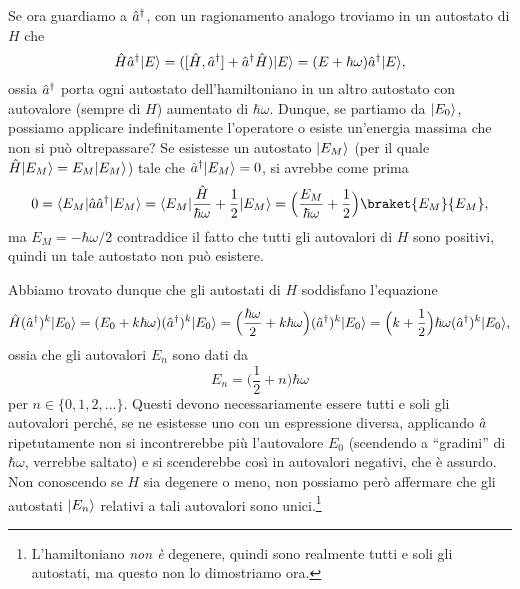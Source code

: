 Se ora guardiamo a $\hat{a}^\dagger$, con un ragionamento analogo troviamo in un autostato di $H$ che
\begin{equation}
	\hat{H}\hat{a}^\dagger\lvert E\rangle=([\hat{H},\hat{a}^\dagger]+\hat{a}^\dagger\hat{H})\lvert E\rangle=(E+\hbar\omega)\hat{a}^\dagger\lvert E\rangle,
\end{equation}
ossia $\hat{a}^\dagger$ porta ogni autostato dell'hamiltoniano in un altro autostato con autovalore (sempre di $H$) aumentato di $\hbar\omega$.
Dunque, se partiamo da $\lvert E_0\rangle$, possiamo applicare indefinitamente l'operatore o esiste un'energia massima che non si può oltrepassare?
Se esistesse un autostato $\lvert E_M\rangle$ (per il quale $\hat{H}\lvert E_M\rangle=E_M\lvert E_M\rangle$) tale che $\hat{a}^\dagger\lvert E_M\rangle=0$, si avrebbe come prima
\begin{equation}
	0=\bra{E_M}\op a\adj{\op a}\ket{E_M}=\bra{E_M}\frac{\op H}{\hbar\omega}+\frac12\ket{E_M}=\Big(\frac{E_M}{\hbar\omega}+\frac12\Big)\braket{E_M}{E_M},
\end{equation}
ma $E_M=-\hbar\omega/2$ contraddice il fatto che tutti gli autovalori di $H$ sono positivi, quindi un tale autostato non può esistere.

Abbiamo trovato dunque che gli autostati di $H$ soddisfano l'equazione
\begin{equation}
	\hat{H}(\hat{a}^\dagger)^k\lvert E_0\rangle=(E_0+k\hbar\omega)(\hat{a}^\dagger)^k\lvert E_0\rangle=\Big(\frac{\hbar\omega}2+k\hbar\omega\Big)(\hat{a}^\dagger)^k\lvert E_0\rangle=\Big(k+\frac12\Big)\hbar\omega(\hat{a}^\dagger)^k\lvert E_0\rangle,
\end{equation}
ossia che gli autovalori $E_n$ sono dati da
\begin{equation}
	E_n=\Big(\frac12+n\Big)\hbar\omega
	\label{eq:oscillatore-armonico-autovalori-hamiltoniano}
\end{equation}
per $n\in\{0,1,2,\dots\}$.
Questi devono necessariamente essere tutti e soli gli autovalori perch\'e, se ne esistesse uno con un espressione diversa, applicando $\hat{a}$ ripetutamente non si incontrerebbe più l'autovalore $E_0$ (scendendo a ``gradini'' di $\hbar\omega$, verrebbe saltato) e si scenderebbe cos\`i in autovalori negativi, che è assurdo.
Non conoscendo se $H$ sia degenere o meno, non possiamo però affermare che gli autostati $\lvert E_n\rangle$ relativi a tali autovalori sono unici.\footnote{L'hamiltoniano \emph{non è} degenere, quindi sono realmente tutti e soli gli autostati, ma questo non lo dimostriamo ora.}

